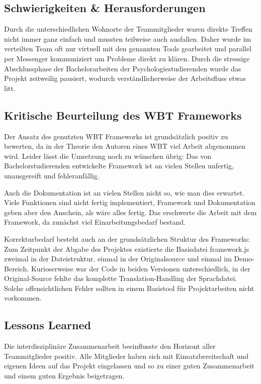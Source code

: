 \documentclass{article}
\begin{document}
\subsection{Schwierigkeiten \& Herausforderungen}
Durch die unterschiedlichen Wohnorte der Teammitglieder waren direkte Treffen nicht immer ganz einfach und mussten teilweise auch ausfallen. Daher wurde im verteilten Team oft nur virtuell mit den genannten Tools gearbeitet und parallel per Messenger kommuniziert um Probleme direkt zu kl\"aren. Durch die stressige Abschlussphase der Bachelorarbeiten der Psychologiestudierenden wurde das Projekt zeitweilig pausiert, wodurch verst\"andlicherweise der Arbeitsfluss etwas litt.

\subsection{Kritische Beurteilung des WBT Frameworks}
Der Ansatz des genutzten WBT Frameworks ist grunds\"atzlich positiv zu bewerten, da in der Theorie den Autoren eines WBT viel Arbeit abgenommen wird. Leider l\"asst die Umsetzung noch zu w\"unschen \"ubrig: Das von Bachelorstudierenden entwickelte Framework ist an vielen Stellen unfertig, unausgereift und fehleranf\"allig. 

Auch die Dokumentation ist an vielen Stellen nicht so, wie man dies erwartet. Viele Funktionen sind nicht fertig implementiert, Framework und Dokumentation geben aber den Anschein, als w\"are alles fertig. Das erschwerte die Arbeit mit dem Framework, da zun\"achst viel Einarbeitungsbedarf bestand.

Korrekturbedarf besteht auch an der grunds\"atzlichen Struktur des Frameworks: Zum Zeitpunkt der Abgabe des Projektes existierte die Basisdatei framework.js zweimal in der Dateistruktur, einmal in der Originalsource und einmal im Demo-Bereich. Kurioserweise war der Code in beiden Versionen unterschiedlich, in der Original-Source fehlte das komplette Translation-Handling der Sprachdatei.
Solche offensichtlichen Fehler sollten in einem Basistool f\"ur Projektarbeiten nicht vorkommen.

\subsection{Lessons Learned}
Die interdisziplin\"are Zusammenarbeit beeinflusste den Horizont aller Teammitglieder positiv. Alle Mitglieder haben sich mit Einsatzbereitschaft und eigenen Ideen auf das Projekt eingelassen und so zu einer guten Zusammenarbeit und einem guten Ergebnis beigetragen.
\end{document}

